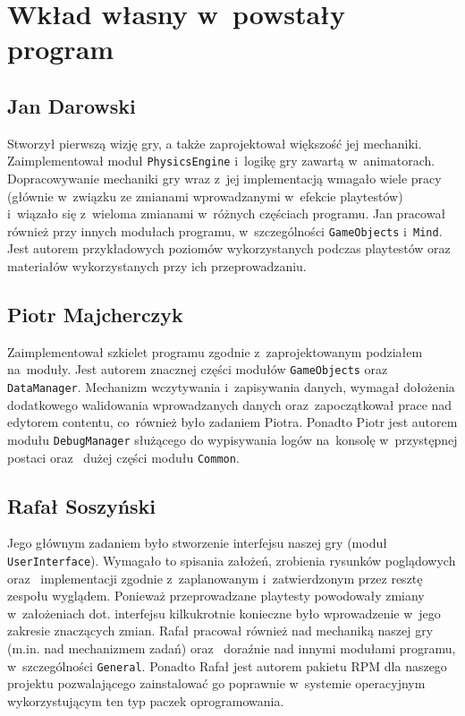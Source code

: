 \documentclass[licencjacka]{pracamgr}
\begin{document}
\chapter{Wkład własny w~powstały program}

  \section{Jan Darowski}
    Stworzył pierwszą wizję gry, a także zaprojektował większość jej mechaniki. Zaimplementował moduł \texttt{PhysicsEngine}
    i~logikę gry zawartą w~animatorach. Dopracowywanie mechaniki gry wraz z~jej implementacją wmagało wiele pracy (głównie w~związku
    ze zmianami wprowadzanymi w~efekcie playtestów) i~wiązało się z~wieloma zmianami w~różnych częściach programu. 
    Jan pracował również przy innych modułach programu, w~szczególności \texttt{GameObjects} i~\texttt{Mind}. 
    Jest autorem przykładowych poziomów wykorzystanych podczas playtestów oraz~ materiałów wykorzystanych przy ich przeprowadzaniu.

  \section{Piotr Majcherczyk}
    Zaimplementował szkielet programu zgodnie z~zaprojektowanym podziałem na~moduły. Jest autorem znacznej części modułów \texttt{GameObjects}
    oraz~ \texttt{DataManager}. Mechanizm wczytywania i~zapisywania danych, wymagał dołożenia dodatkowego walidowania wprowadzanych danych
    oraz~zapoczątkował prace nad edytorem contentu, co~również było zadaniem Piotra. Ponadto Piotr jest autorem modułu \texttt{DebugManager}
    służącego do wypisywania logów na~konsolę w~przystępnej postaci oraz~ dużej części modułu \texttt{Common}.

  \section{Rafał Soszyński}
    Jego głównym zadaniem było stworzenie interfejsu naszej gry (moduł \texttt{UserInterface}). Wymagało to spisania założeń, zrobienia 
    rysunków poglądowych oraz~ implementacji zgodnie z~zaplanowanym i~zatwierdzonym przez resztę zespołu wyglądem. Ponieważ przeprowadzane
    playtesty powodowały zmiany w~założeniach dot. interfejsu kilkukrotnie konieczne było wprowadzenie w~jego zakresie znaczących zmian.
    Rafał pracował również nad mechaniką naszej gry (m.in. nad mechanizmem zadań) oraz~ doraźnie nad innymi modułami programu, w~szczególności
    \texttt{General}. Ponadto Rafał jest autorem pakietu RPM dla naszego projektu pozwalającego zainstalować go poprawnie w~systemie operacyjnym
    wykorzystującym ten typ paczek oprogramowania.
\end{document}
